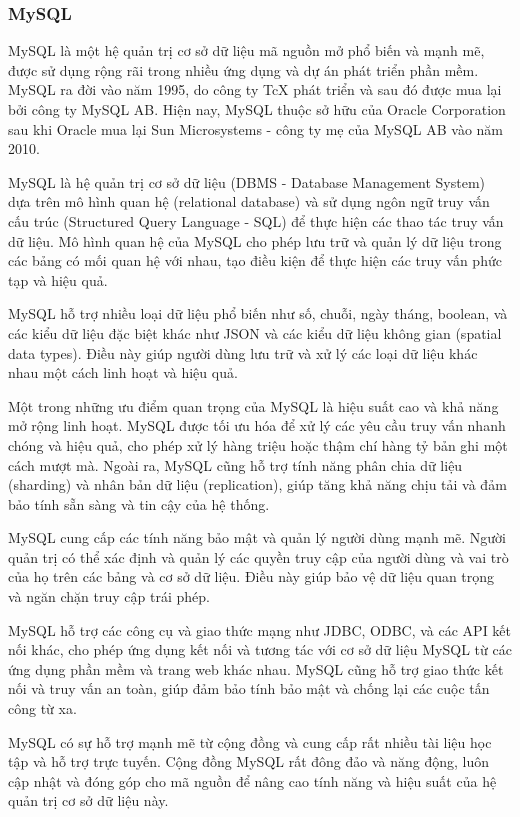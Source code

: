 \subsubsection{MySQL}
\mbox{}

MySQL là một hệ quản trị cơ sở dữ liệu mã nguồn mở phổ biến và mạnh mẽ, được sử dụng rộng rãi trong nhiều ứng dụng và dự án phát triển phần mềm. MySQL ra đời vào năm 1995, do công ty TcX phát triển và sau đó được mua lại bởi công ty MySQL AB. Hiện nay, MySQL thuộc sở hữu của Oracle Corporation sau khi Oracle mua lại Sun Microsystems - công ty mẹ của MySQL AB vào năm 2010. \cite{mysql_1}

MySQL là hệ quản trị cơ sở dữ liệu (DBMS - Database Management System) dựa trên mô hình quan hệ (relational database) và sử dụng ngôn ngữ truy vấn cấu trúc (Structured Query Language - SQL) để thực hiện các thao tác truy vấn dữ liệu. Mô hình quan hệ của MySQL cho phép lưu trữ và quản lý dữ liệu trong các bảng có mối quan hệ với nhau, tạo điều kiện để thực hiện các truy vấn phức tạp và hiệu quả. \cite{myql_2}

MySQL hỗ trợ nhiều loại dữ liệu phổ biến như số, chuỗi, ngày tháng, boolean, và các kiểu dữ liệu đặc biệt khác như JSON và các kiểu dữ liệu không gian (spatial data types). Điều này giúp người dùng lưu trữ và xử lý các loại dữ liệu khác nhau một cách linh hoạt và hiệu quả.

Một trong những ưu điểm quan trọng của MySQL là hiệu suất cao và khả năng mở rộng linh hoạt. MySQL được tối ưu hóa để xử lý các yêu cầu truy vấn nhanh chóng và hiệu quả, cho phép xử lý hàng triệu hoặc thậm chí hàng tỷ bản ghi một cách mượt mà. Ngoài ra, MySQL cũng hỗ trợ tính năng phân chia dữ liệu (sharding) và nhân bản dữ liệu (replication), giúp tăng khả năng chịu tải và đảm bảo tính sẵn sàng và tin cậy của hệ thống.

MySQL cung cấp các tính năng bảo mật và quản lý người dùng mạnh mẽ. Người quản trị có thể xác định và quản lý các quyền truy cập của người dùng và vai trò của họ trên các bảng và cơ sở dữ liệu. Điều này giúp bảo vệ dữ liệu quan trọng và ngăn chặn truy cập trái phép.

MySQL hỗ trợ các công cụ và giao thức mạng như JDBC, ODBC, và các API kết nối khác, cho phép ứng dụng kết nối và tương tác với cơ sở dữ liệu MySQL từ các ứng dụng phần mềm và trang web khác nhau. MySQL cũng hỗ trợ giao thức kết nối và truy vấn an toàn, giúp đảm bảo tính bảo mật và chống lại các cuộc tấn công từ xa.

MySQL có sự hỗ trợ mạnh mẽ từ cộng đồng và cung cấp rất nhiều tài liệu học tập và hỗ trợ trực tuyến. Cộng đồng MySQL rất đông đảo và năng động, luôn cập nhật và đóng góp cho mã nguồn để nâng cao tính năng và hiệu suất của hệ quản trị cơ sở dữ liệu này.

